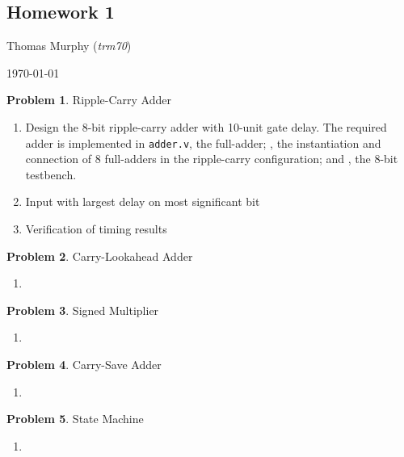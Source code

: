 \documentclass[10pt]{article}
\theoremstyle{definition}
\newtheorem{problem}{Problem}
\begin{document}
  \begin{center}
  \section*{Homework 1}
  \end{center}
  Thomas Murphy (\textit{trm70})

  \today

  \bigskip

  \begin{problem}
    Ripple-Carry Adder

    \begin{enumerate}
      \item Design the 8-bit ripple-carry adder with 10-unit gate delay. The required adder is implemented in \texttt{adder.v}, the full-adder; \texttt{}, the instantiation and connection of 8 full-adders in the ripple-carry configuration; and \texttt{}, the 8-bit testbench.
      \item Input with largest delay on most significant bit
      \item Verification of timing results
    \end{enumerate}
  \end{problem}

  \newpage

  \begin{problem}
    Carry-Lookahead Adder

    \begin{enumerate}
      \item
    \end{enumerate}
  \end{problem}

  \newpage

  \begin{problem}
    Signed Multiplier

    \begin{enumerate}
      \item
    \end{enumerate}
  \end{problem}

  \newpage

  \begin{problem}
    Carry-Save Adder

    \begin{enumerate}
      \item
    \end{enumerate}
  \end{problem}

  \newpage

  \begin{problem}
    State Machine

    \begin{enumerate}
      \item
    \end{enumerate}
  \end{problem}
\end{document}
